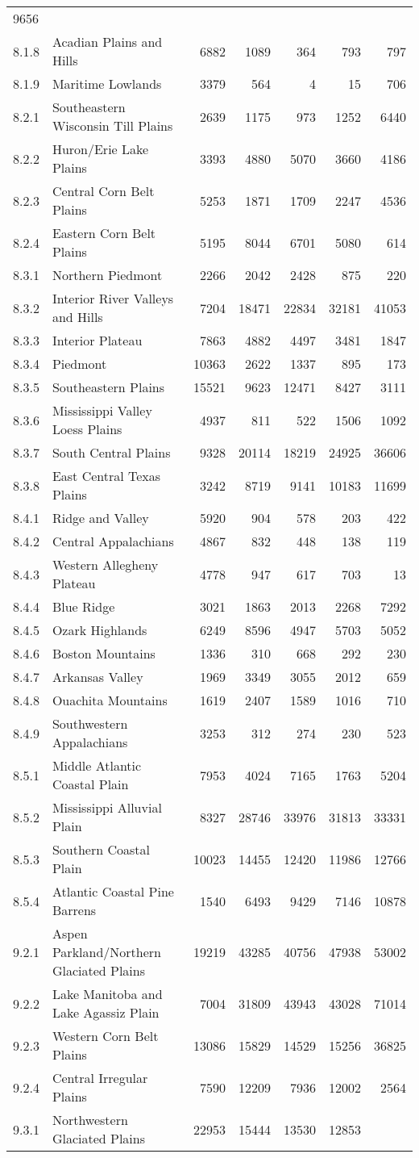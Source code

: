 \documentclass[]{article}
\begin{document}
\begin{longtable}[]{@{}llrrrrr@{}}
9656\tabularnewline
8.1.8 & Acadian Plains and Hills & 6882 & 1089 & 364 & 793 &
797\tabularnewline
8.1.9 & Maritime Lowlands & 3379 & 564 & 4 & 15 & 706\tabularnewline
8.2.1 & Southeastern Wisconsin Till Plains & 2639 & 1175 & 973 & 1252 &
6440\tabularnewline
8.2.2 & Huron/Erie Lake Plains & 3393 & 4880 & 5070 & 3660 &
4186\tabularnewline
8.2.3 & Central Corn Belt Plains & 5253 & 1871 & 1709 & 2247 &
4536\tabularnewline
8.2.4 & Eastern Corn Belt Plains & 5195 & 8044 & 6701 & 5080 &
614\tabularnewline
8.3.1 & Northern Piedmont & 2266 & 2042 & 2428 & 875 &
220\tabularnewline
8.3.2 & Interior River Valleys and Hills & 7204 & 18471 & 22834 & 32181
& 41053\tabularnewline
8.3.3 & Interior Plateau & 7863 & 4882 & 4497 & 3481 &
1847\tabularnewline
8.3.4 & Piedmont & 10363 & 2622 & 1337 & 895 & 173\tabularnewline
8.3.5 & Southeastern Plains & 15521 & 9623 & 12471 & 8427 &
3111\tabularnewline
8.3.6 & Mississippi Valley Loess Plains & 4937 & 811 & 522 & 1506 &
1092\tabularnewline
8.3.7 & South Central Plains & 9328 & 20114 & 18219 & 24925 &
36606\tabularnewline
8.3.8 & East Central Texas Plains & 3242 & 8719 & 9141 & 10183 &
11699\tabularnewline
8.4.1 & Ridge and Valley & 5920 & 904 & 578 & 203 & 422\tabularnewline
8.4.2 & Central Appalachians & 4867 & 832 & 448 & 138 &
119\tabularnewline
8.4.3 & Western Allegheny Plateau & 4778 & 947 & 617 & 703 &
13\tabularnewline
8.4.4 & Blue Ridge & 3021 & 1863 & 2013 & 2268 & 7292\tabularnewline
8.4.5 & Ozark Highlands & 6249 & 8596 & 4947 & 5703 &
5052\tabularnewline
8.4.6 & Boston Mountains & 1336 & 310 & 668 & 292 & 230\tabularnewline
8.4.7 & Arkansas Valley & 1969 & 3349 & 3055 & 2012 & 659\tabularnewline
8.4.8 & Ouachita Mountains & 1619 & 2407 & 1589 & 1016 &
710\tabularnewline
8.4.9 & Southwestern Appalachians & 3253 & 312 & 274 & 230 &
523\tabularnewline
8.5.1 & Middle Atlantic Coastal Plain & 7953 & 4024 & 7165 & 1763 &
5204\tabularnewline
8.5.2 & Mississippi Alluvial Plain & 8327 & 28746 & 33976 & 31813 &
33331\tabularnewline
8.5.3 & Southern Coastal Plain & 10023 & 14455 & 12420 & 11986 &
12766\tabularnewline
8.5.4 & Atlantic Coastal Pine Barrens & 1540 & 6493 & 9429 & 7146 &
10878\tabularnewline
9.2.1 & Aspen Parkland/Northern Glaciated Plains & 19219 & 43285 & 40756
& 47938 & 53002\tabularnewline
9.2.2 & Lake Manitoba and Lake Agassiz Plain & 7004 & 31809 & 43943 &
43028 & 71014\tabularnewline
9.2.3 & Western Corn Belt Plains & 13086 & 15829 & 14529 & 15256 &
36825\tabularnewline
9.2.4 & Central Irregular Plains & 7590 & 12209 & 7936 & 12002 &
2564\tabularnewline
9.3.1 & Northwestern Glaciated Plains & 22953 & 15444 & 13530 & 12853 &

\end{longtable}
\end{document}
